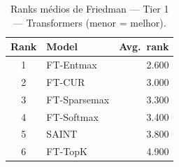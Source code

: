 \begin{table}[ht]
  \centering
  \caption{Ranks médios de Friedman — Tier 1 — Transformers (menor = melhor).}
  \label{tab:tier1_transformers_ranks}
  \begin{tabular}{clr}
    \toprule
    Rank & Model & Avg.\ rank \\
    \midrule
1 & FT-Entmax & 2.600 \\
2 & FT-CUR & 3.000 \\
3 & FT-Sparsemax & 3.300 \\
4 & FT-Softmax & 3.400 \\
5 & SAINT & 3.800 \\
6 & FT-TopK & 4.900 \\
    \bottomrule
  \end{tabular}
\end{table}